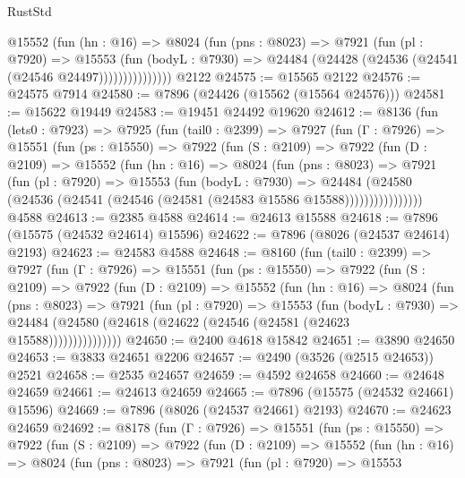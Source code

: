 \begin{lexlean}{RustStd}
\begin{coremodule}
                @15552
                  (fun (hn : @16) =>
                  @8024
                    (fun (pns : @8023) =>
                    @7921
                      (fun (pl : @7920) =>
                      @15553
                        (fun (bodyL : @7930) =>
                        @24484 (@24428 (@24536 (@24541 (@24546 @24497)))))))))))))))
    @2122
@24575 := @15565 @2122
@24576 := @24575 @7914
@24580 := @7896 (@24426 (@15562 (@15564 @24576)))
@24581 := @15622 @19449
@24583 := @19451 @24492 @19620
@24612 := @8136
    (fun (lets0 : @7923) =>
    @7925
      (fun (tail0 : @2399) =>
      @7927
        (fun (Γ : @7926) =>
        @15551
          (fun (ps : @15550) =>
          @7922
            (fun (S : @2109) =>
            @7922
              (fun (D : @2109) =>
              @15552
                (fun (hn : @16) =>
                @8024
                  (fun (pns : @8023) =>
                  @7921
                    (fun (pl : @7920) =>
                    @15553
                      (fun (bodyL : @7930) =>
                      @24484
                        (@24580
                          (@24536 (@24541 (@24546 (@24581 (@24583 @15586 @15588))))))))))))))))
    @4588
@24613 := @2385 @4588
@24614 := @24613 @15588
@24618 := @7896 (@15575 (@24532 @24614) @15596)
@24622 := @7896 (@8026 (@24537 @24614) @2193)
@24623 := @24583 @4588
@24648 := @8160
    (fun (tail0 : @2399) =>
    @7927
      (fun (Γ : @7926) =>
      @15551
        (fun (ps : @15550) =>
        @7922
          (fun (S : @2109) =>
          @7922
            (fun (D : @2109) =>
            @15552
              (fun (hn : @16) =>
              @8024
                (fun (pns : @8023) =>
                @7921
                  (fun (pl : @7920) =>
                  @15553
                    (fun (bodyL : @7930) =>
                    @24484 (@24580 (@24618 (@24622 (@24546 (@24581 (@24623 @15588)))))))))))))))
@24650 := @2400 @4618 @15842
@24651 := @3890 @24650
@24653 := @3833 @24651 @2206
@24657 := @2490 (@3526 (@2515 @24653)) @2521
@24658 := @2535 @24657
@24659 := @4592 @24658
@24660 := @24648 @24659
@24661 := @24613 @24659
@24665 := @7896 (@15575 (@24532 @24661) @15596)
@24669 := @7896 (@8026 (@24537 @24661) @2193)
@24670 := @24623 @24659
@24692 := @8178
    (fun (Γ : @7926) =>
    @15551
      (fun (ps : @15550) =>
      @7922
        (fun (S : @2109) =>
        @7922
          (fun (D : @2109) =>
          @15552
            (fun (hn : @16) =>
            @8024
              (fun (pns : @8023) =>
              @7921
                (fun (pl : @7920) =>
                @15553

\end{coremodule}
\end{lexlean}
